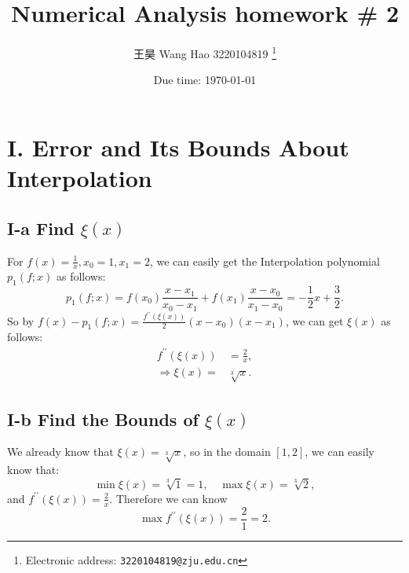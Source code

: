 \documentclass[a4paper]{article}
\begin{document}
\title{Numerical Analysis homework \# 2}

\author{王昊 Wang Hao 3220104819
  \thanks{Electronic address: \texttt{3220104819@zju.edu.cn}}}


\date{Due time: \today}

\maketitle



\section*{I. Error and Its Bounds About Interpolation}

\subsection*{I-a Find $\xi(x)$}

For $f(x) = \frac{1}{x}, x_0=1, x_1=2$, we can easily get the Interpolation polynomial $p_1(f; x)$ as follows:
\begin{equation}
  p_1(f; x) = f(x_0) \frac{x-x_1}{x_0-x_1} + f(x_1) \frac{x-x_0}{x_1-x_0} = -\frac{1}{2} x + \frac{3}{2} .
\end{equation}
So by $f(x) - p_1(f; x) = \frac{f^{\prime \prime} (\xi (x))}{2} (x-x_0) (x-x_1)$, we can get $\xi(x)$ as follows:
\begin{equation}
  \begin{aligned}
    f^{\prime \prime} (\xi (x)) &= \frac{2}{x}, \\
    \Rightarrow \xi (x) = &\sqrt[3]{x}.
  \end{aligned}
\end{equation}
\subsection*{I-b Find the Bounds of $\xi(x)$}

We already know that $\xi(x) = \sqrt[3]{x}$, so in the domain $[1,2]$, we can easily know that:
\begin{equation}
  \min \xi(x) = \sqrt[3]{1} = 1, \quad \max \xi(x) = \sqrt[3]{2},
\end{equation}
and $f^{\prime \prime}(\xi(x)) = \frac{2}{x}$. Therefore we can know
\begin{equation}
  \max f^{\prime \prime}(\xi(x)) = \frac{2}{1} = 2. 
\end{equation}
\end{document}
